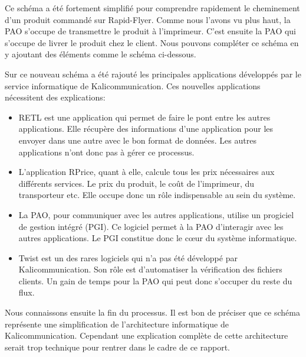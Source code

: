 

Ce schéma a été fortement simplifié pour comprendre rapidement le cheminement d'un produit commandé sur Rapid-Flyer. Comme nous l'avons vu plus haut, la PAO s'occupe de transmettre le produit à l'imprimeur. C'est ensuite la PAO qui s'occupe de livrer le produit chez le client. Nous pouvons compléter ce schéma en y ajoutant des éléments comme le schéma ci-dessous.



Sur ce nouveau schéma a été rajouté les principales applications développés par le service informatique de Kalicommunication. Ces nouvelles applications nécessitent des explications:
\begin{itemize}
\item RETL est une application qui permet de faire le pont entre les autres applications. Elle récupère des informations d'une application pour les envoyer dans une autre avec le bon format de données. Les autres applications n'ont donc pas à gérer ce processus.
\item L'application RPrice, quant à elle, calcule tous les prix nécessaires aux différents services. Le prix du produit, le coût de l'imprimeur, du transporteur etc. Elle occupe donc un rôle indispensable au sein du système.
\item La PAO, pour communiquer avec les autres applications, utilise un progiciel de gestion intégré (PGI). Ce logiciel permet à la PAO d'interagir avec les autres applications. Le PGI constitue donc le cœur du système informatique.
\item Twist est un des rares logiciels qui n'a pas été développé par Kalicommunication. Son rôle est d'automatiser la vérification des fichiers clients. Un gain de temps pour la PAO qui peut donc s'occuper du reste du flux.\newline
\end{itemize}
Nous connaissons ensuite la fin du processus. Il est bon de préciser que ce schéma représente une simplification de l'architecture informatique de Kalicommunication. Cependant une explication complète de cette architecture serait trop technique pour rentrer dans le cadre de ce rapport.